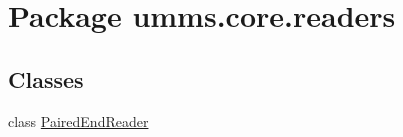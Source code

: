 \hypertarget{namespaceumms_1_1core_1_1readers}{\section{Package umms.\+core.\+readers}
\label{namespaceumms_1_1core_1_1readers}
}
\subsection*{Classes}
\begin{DoxyCompactItemize}
\item 
class \hyperlink{classumms_1_1core_1_1readers_1_1_paired_end_reader}{Paired\+End\+Reader}
\end{DoxyCompactItemize}

